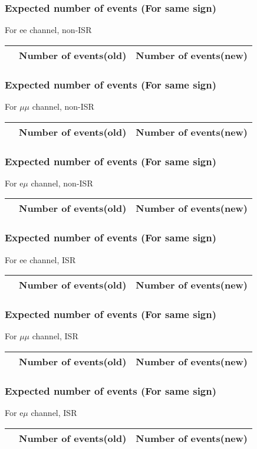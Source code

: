 \begin{frame}
\frametitle{Expected number of events (For same sign)}
For ee channel, non-ISR\\
\vspace{5mm}
\begin{tabular}{|c|c|c|}
\hline
& Number of events(old) & Number of events(new) \\
\hline

\end{tabular}
\end{frame}

\begin{frame}
\frametitle{Expected number of events (For same sign)}
For $\mu\mu$ channel, non-ISR\\
\vspace{5mm}
\begin{tabular}{|c|c|c|}
\hline
& Number of events(old) & Number of events(new) \\
\hline

\end{tabular}
\end{frame}

\begin{frame}
\frametitle{Expected number of events (For same sign)}
For e$\mu$ channel, non-ISR\\
\vspace{5mm}
\begin{tabular}{|c|c|c|}
\hline
& Number of events(old) & Number of events(new) \\
\hline

\end{tabular}
\end{frame}

\begin{frame}
\frametitle{Expected number of events (For same sign)}
For ee channel, ISR\\
\vspace{5mm}
\begin{tabular}{|c|c|c|}
\hline
& Number of events(old) & Number of events(new) \\
\hline

\end{tabular}
\end{frame}

\begin{frame}
\frametitle{Expected number of events (For same sign)}
For $\mu\mu$ channel, ISR\\
\vspace{5mm}
\begin{tabular}{|c|c|c|}
\hline
& Number of events(old) & Number of events(new) \\
\hline

\end{tabular}
\end{frame}

\begin{frame}
\frametitle{Expected number of events (For same sign)}
For e$\mu$ channel, ISR\\
\vspace{5mm}
\begin{tabular}{|c|c|c|}
\hline
& Number of events(old) & Number of events(new) \\
\hline

\end{tabular}
\end{frame}

